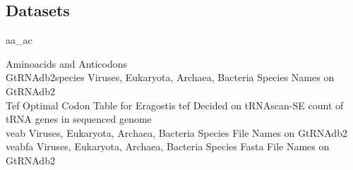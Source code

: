 \subsection{Datasets}
\hypertarget{data:aaac}{aa\_ac}	\quad Aminoacids and Anticodons \\
\hypertarget{data:species}{GtRNAdb2species}	\quad Viruses, Eukaryota, Archaea, Bacteria Species Names on GtRNAdb2 \\
\hypertarget{data:Tef}{Tef}	\quad Optimal Codon Table for Eragostis tef Decided on tRNAscan-SE count of tRNA genes in sequenced genome \\
\hypertarget{data:veab}{veab}		\quad Viruses, Eukaryota, Archaea, Bacteria Species File Names on GtRNAdb2 \\
\hypertarget{data:veabfa}{veabfa}	\quad Viruses, Eukaryota, Archaea, Bacteria Species Fasta File Names on GtRNAdb2 \\

